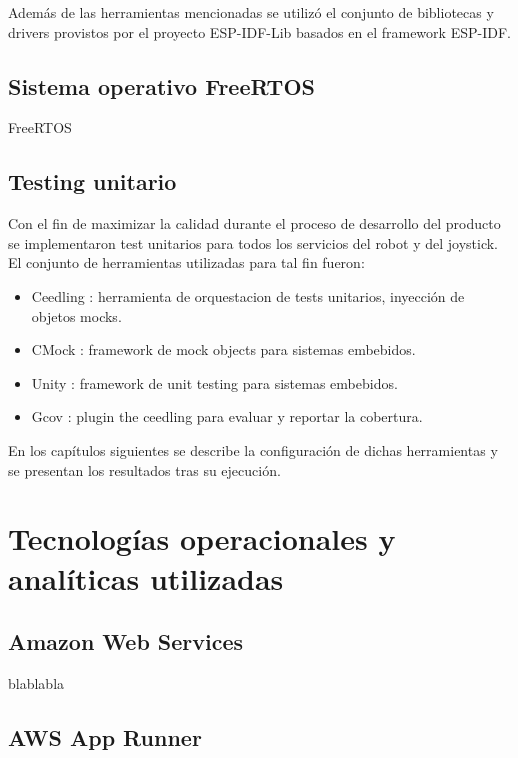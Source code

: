 Además de las herramientas mencionadas se utilizó el conjunto de bibliotecas y drivers provistos por el proyecto ESP-IDF-Lib \cite{esp_idf_lib_website} basados en el framework ESP-IDF.



\subsection{Sistema operativo FreeRTOS}
 FreeRTOS \citep{FreeRTOS} 



\subsection{Testing unitario}
Con el fin de maximizar la calidad durante el proceso de desarrollo del producto se implementaron test unitarios para todos los servicios del robot y del joystick. El conjunto de herramientas utilizadas para tal fin fueron:
\begin{itemize}
	\item Ceedling \cite{SoftwareTool_Ceedling}: herramienta de orquestacion de tests unitarios, inyección de objetos mocks.
	\item CMock \cite{SoftwareTool_CMock}: framework de mock objects para sistemas embebidos.
	\item Unity \cite{SoftwareTool_Unity}: framework de unit testing para sistemas embebidos.
	\item Gcov \cite{SoftwareTool_CeedlingGCov}: plugin the ceedling para evaluar y reportar la cobertura.
\end{itemize}

En los capítulos siguientes se describe la configuración de dichas herramientas y se presentan los resultados tras su ejecución.


\section{Tecnologías operacionales y analíticas utilizadas}


\subsection{Amazon Web Services}

blablabla



\subsection{AWS App Runner}

